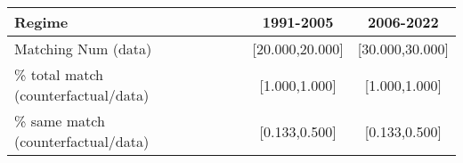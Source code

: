 
\begin{tabular}[t]{lccc}
\toprule
Regime &  & 1991-2005 & 2006-2022\\
\midrule
Matching Num (data) &  & {}[20.000,20.000] & {}[30.000,30.000]\\
\% total match (counterfactual/data) &  & {}[1.000,1.000] & {}[1.000,1.000]\\
\% same match (counterfactual/data) &  & {}[0.133,0.500] & {}[0.133,0.500]\\
\bottomrule
\end{tabular}
